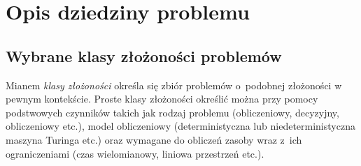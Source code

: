 \section{Opis dziedziny problemu}\label{Section_Domain}
\subsection{Wybrane klasy złożoności problemów}\label{subsection_p_np}
\par{
  Mianem \emph{klasy złożoności} określa się zbiór problemów o~podobnej
  złożoności w pewnym kontekście. 
  Proste klasy złożoności określić można przy pomocy podstwowych czynników takich
  jak rodzaj problemu (obliczeniowy, decyzyjny, obliczeniowy etc.), model
  obliczeniowy (deterministyczna lub niedeterministyczna maszyna Turinga etc.)
  oraz wymagane do obliczeń zasoby wraz z~ich ograniczeniami (czas wielomianowy,
  liniowa przestrzeń etc.).
}

